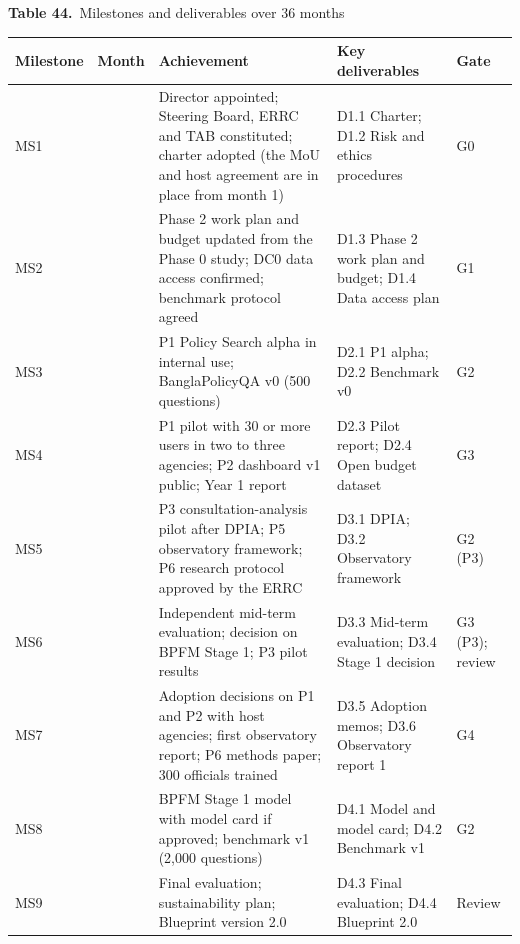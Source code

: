 \documentclass[border=10pt]{standalone}
\begin{document}
\begin{minipage}{17cm}
{\large\bfseries Table 44.}\ {\large Milestones and deliverables over 36 months}\par\vspace{7pt}
\small
{}
\begin{tabularx}{\linewidth}{@{}>{\hsize=0.517\hsize\raggedright\arraybackslash}X>{\hsize=0.460\hsize\raggedright\arraybackslash}X>{\hsize=2.299\hsize\raggedright\arraybackslash}X>{\hsize=1.264\hsize\raggedright\arraybackslash}X>{\hsize=0.460\hsize\raggedright\arraybackslash}X@{}}
\arrayrulecolor{bapilrule}\toprule
\rowcolor{white}\textbf{Milestone} & \textbf{Month} & \textbf{Achievement} & \textbf{Key deliverables} & \textbf{Gate} \\
\midrule
MS1 & 3 & Director appointed; Steering Board, ERRC and TAB constituted; charter adopted (the MoU and host agreement are in place from month 1) & D1.1 Charter; D1.2 Risk and ethics procedures & G0 \\
MS2 & 6 & Phase 2 work plan and budget updated from the Phase 0 study; DC0 data access confirmed; benchmark protocol agreed & D1.3 Phase 2 work plan and budget; D1.4 Data access plan & G1 \\
MS3 & 9 & P1 Policy Search alpha in internal use; BanglaPolicyQA v0 (500 questions) & D2.1 P1 alpha; D2.2 Benchmark v0 & G2 \\
MS4 & 12 & P1 pilot with 30 or more users in two to three agencies; P2 dashboard v1 public; Year 1 report & D2.3 Pilot report; D2.4 Open budget dataset & G3 \\
MS5 & 15 & P3 consultation-analysis pilot after DPIA; P5 observatory framework; P6 research protocol approved by the ERRC & D3.1 DPIA; D3.2 Observatory framework & G2 (P3) \\
MS6 & 18 & Independent mid-term evaluation; decision on BPFM Stage 1; P3 pilot results & D3.3 Mid-term evaluation; D3.4 Stage 1 decision & G3 (P3); review \\
MS7 & 24 & Adoption decisions on P1 and P2 with host agencies; first observatory report; P6 methods paper; 300 officials trained & D3.5 Adoption memos; D3.6 Observatory report 1 & G4 \\
MS8 & 30 & BPFM Stage 1 model with model card if approved; benchmark v1 (2,000 questions) & D4.1 Model and model card; D4.2 Benchmark v1 & G2 \\
MS9 & 36 & Final evaluation; sustainability plan; Blueprint version 2.0 & D4.3 Final evaluation; D4.4 Blueprint 2.0 & Review \\
\bottomrule
\end{tabularx}
\par\vspace{5pt}{\footnotesize\itshape Month 1 is the first month in which the MoU, the host agreement and Year 1 funding are all in place (Annex T), after a preparatory Phase 0 of about six months; July 2027, the start of FY2027-28, is the earliest plausible calendar start.}
\par{}
\end{minipage}
\end{document}
